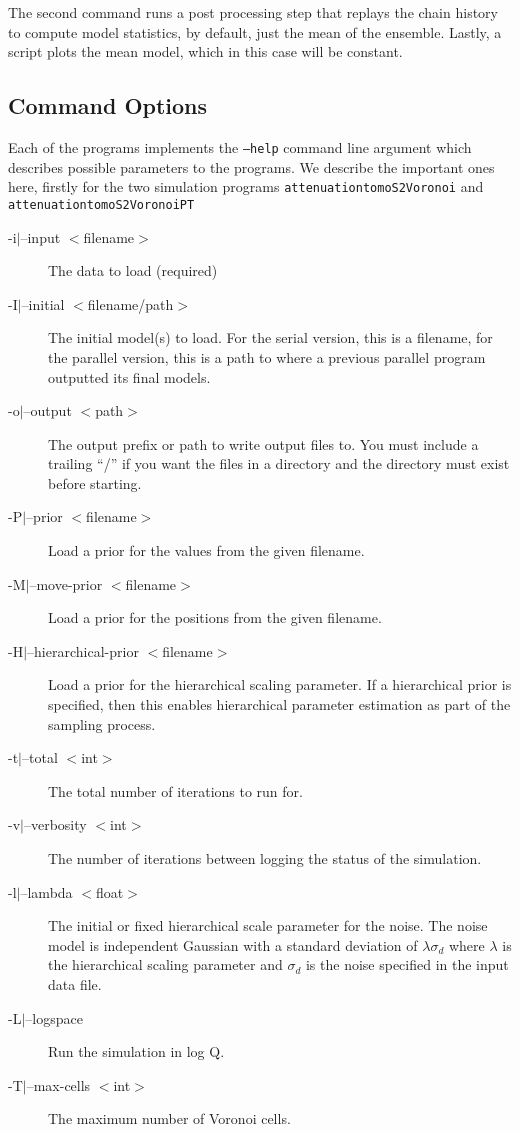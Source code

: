 \documentclass{article}
\begin{document}
The second command runs a post processing step that replays the chain history
to compute model statistics, by default, just the mean of the ensemble. Lastly,
a script plots the mean model, which in this case will be constant.

\subsection{Command Options}

Each of the programs implements the {\tt --help} command line argument
which describes possible parameters to the programs. We describe the
important ones here, firstly for the two simulation programs {\tt attenuationtomoS2Voronoi}
and {\tt attenuationtomoS2VoronoiPT}

\begin{description}
\item [-i$|$--input $<$filename$>$] The data to load (required)
\item [-I$|$--initial $<$filename/path$>$] The initial model(s) to load. For the serial version,
  this is a filename, for the parallel version, this is a path to where a previous parallel
  program outputted its final models.
\item [-o$|$--output $<$path$>$] The output prefix or path to write output files to. You must include
  a trailing ``/'' if you want the files in a directory and the directory must exist before starting.
\item [-P$|$--prior $<$filename$>$] Load a prior for the values from the given filename.
\item [-M$|$--move-prior $<$filename$>$] Load a prior for the positions from the given filename.
\item [-H$|$--hierarchical-prior $<$filename$>$] Load a prior for the hierarchical scaling parameter. If a
  hierarchical prior is specified, then this enables hierarchical parameter estimation as part of the
  sampling process.
\item [-t$|$--total $<$int$>$] The total number of iterations to run for.
\item [-v$|$--verbosity $<$int$>$] The number of iterations between logging the status of the simulation.
\item [-l$|$--lambda $<$float$>$] The initial or fixed hierarchical scale parameter for the noise. The noise
  model is independent Gaussian with a standard deviation of $\lambda \sigma_d$ where $\lambda$ is
  the hierarchical scaling parameter and $\sigma_d$ is the noise specified in the input data file.
\item [-L$|$--logspace] Run the simulation in log Q.
\item [-T$|$--max-cells $<$int$>$] The maximum number of Voronoi cells.
\end{description}
\end{document}
